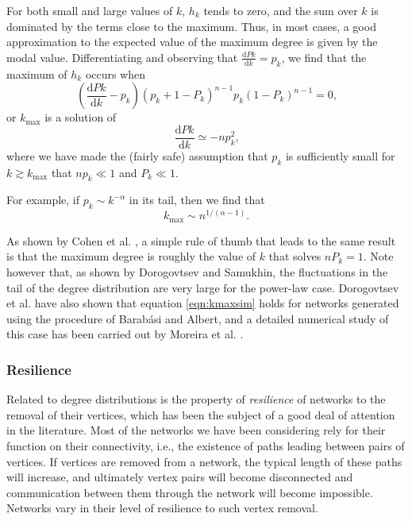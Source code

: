         For both small and large values of $k$, $h_k$ tends to zero, and the sum over $k$ is dominated by the terms close to the maximum. Thus, in most cases, a good approximation to the expected value of the maximum degree is given by the modal value. Differentiating and observing that $\frac{\mbox{d}Pk}{\mbox{d}k} = p_k$, we find that the maximum of $h_k$ occurs when
        \begin{equation}
          \left(\frac{\mbox{d}Pk}{\mbox{d}k} - p_k\right)(p_k + 1 - P_k)^{n-1} p_k(1 - P_k)^{n-1} = 0\mbox{,}
        \end{equation}
        or $k_{\mbox{max}}$ is a solution of
        \begin{equation}
          \frac{\mbox{d}Pk}{\mbox{d}k} \simeq -np^2_k\mbox{,}
        \end{equation}
        where we have made the (fairly safe) assumption that $p_k$ is sufficiently small for $k \gtrsim k_{\mbox{max}}$ that $np_k \ll 1$ and $P_k \ll 1$.
        
        For example, if $p_k \sim k^{−\alpha}$ in its tail, then we find that
        \begin{equation}
          k_{\mbox{max}} \sim n^{1/(\alpha-1)}\mbox{.} \label{eqn:kmaxsim}
        \end{equation}
        
        As shown by Cohen et al. \cite{CohenErezAvrahamHavlin2000}, a simple rule of thumb that leads to the same result is that the maximum degree is roughly the value of $k$ that solves $nP_k = 1$. Note however that, as shown by Dorogovtsev and Samukhin\cite{DorogovtsevSamukhin2002}, the fluctuations in the tail of the degree distribution are very large for the power-law case. Dorogovtsev et al. \cite{DorogovtsevMendesSamukhin2001} have also shown that equation \ref{eqn:kmaxsim} holds for networks generated using the  procedure of Barabási and Albert\cite{BarabasiAlbert1999}, and a detailed numerical study of this case has been carried out by Moreira et al. \cite{MoreiraAndradeAmaral2002}.
        
    \subsubsection{Resilience}
    
      Related to degree distributions is the property of \emph{resilience} of networks to the removal of their vertices, which has been the subject of a good deal of attention in the literature. Most of the networks we have been considering rely for their function on their connectivity, i.e., the existence of paths leading between pairs of vertices. If vertices are removed from a network, the typical length of these paths will increase, and ultimately vertex pairs will become disconnected and communication between them through the network will become impossible. Networks vary in their level of resilience to such vertex removal.
      
